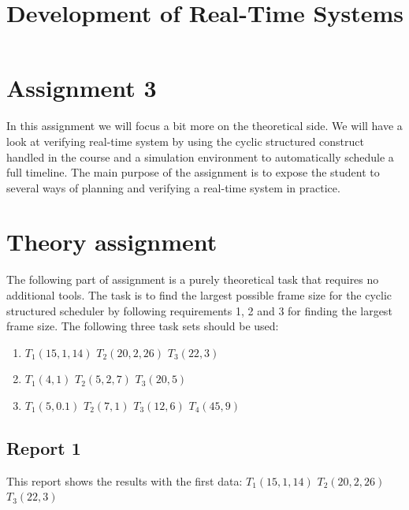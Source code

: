 \documentclass[12pt]{article}
\title{Development of Real-Time Systems}
\begin{document}
\maketitle

\section*{Assignment 3}

In this assignment we will focus a bit more on the theoretical side. We will have a look at verifying real-time system by using the cyclic structured construct handled in the course and a simulation environment to automatically schedule a full timeline. The main purpose of the assignment is to expose the student to several ways of planning and verifying a real-time system in practice.

\section{Theory assignment}

The following part of assignment is a purely theoretical task that requires no additional tools. The task is to find the largest possible frame size for the cyclic structured scheduler by following requirements 1, 2 and 3 for finding the largest frame size. The following three task sets should be used:

\begin{enumerate}
\item $T_{1}(15,1,14)$ $T_{2}(20,2,26)$ $T_{3}(22,3)$
\item $T_{1}(4,1)$ $T_{2}(5,2,7)$ $T_{3}(20,5)$
\item $T_{1}(5,0.1)$ $T_{2}(7,1)$ $T_{3}(12,6)$ $T_{4}(45,9)$
\end{enumerate}

\subsection{Report 1}

This report shows the results with the first data: $T_{1}(15,1,14)$ $T_{2}(20,2,26)$ $T_{3}(22,3)$
\end{document}
